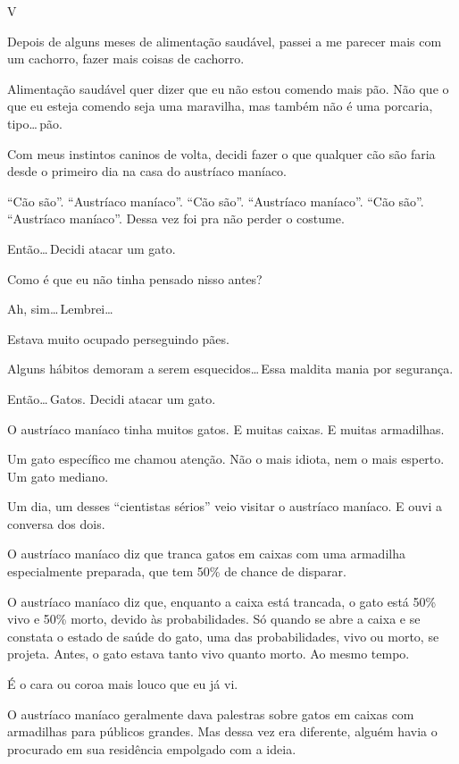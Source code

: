 \begin{center}
{\Large V}
\end{center}

Depois de alguns meses de alimentação saudável, passei a me parecer mais com um cachorro, fazer mais coisas de cachorro.

Alimentação saudável quer dizer que eu não estou comendo mais pão. Não que o que eu esteja comendo seja uma maravilha, mas também não é uma porcaria, tipo\ldots\,pão.

Com meus instintos caninos de volta, decidi fazer o que qualquer cão são faria desde o primeiro dia na casa do austríaco maníaco.

``Cão são''. ``Austríaco maníaco''. ``Cão são''. ``Austríaco maníaco''. ``Cão são''. ``Austríaco maníaco''. Dessa vez foi pra não perder o costume.

Então\ldots\,Decidi atacar um gato.

Como é que eu não tinha pensado nisso antes?

Ah, sim\ldots\,Lembrei\ldots

Estava muito ocupado perseguindo pães.

Alguns hábitos demoram a serem esquecidos\ldots\,Essa maldita mania por segurança.

Então\ldots\,Gatos. Decidi atacar um gato.

O austríaco maníaco tinha muitos gatos. E muitas caixas. E muitas armadilhas.

Um gato específico me chamou atenção. Não o mais idiota, nem o mais esperto. Um gato mediano.

Um dia, um desses ``cientistas sérios'' veio visitar o austríaco maníaco. E ouvi a conversa dos dois.

O austríaco maníaco diz que tranca gatos em caixas com uma armadilha especialmente preparada, que tem 50\% de chance de disparar.

O austríaco maníaco diz que, enquanto a caixa está trancada, o gato está 50\% vivo e 50\% morto, devido às probabilidades. Só quando se abre a caixa e se constata o estado de saúde do gato, uma das probabilidades, vivo ou morto, se projeta. Antes, o gato estava tanto vivo quanto morto. Ao mesmo tempo.

É o cara ou coroa mais louco que eu já vi.

O austríaco maníaco geralmente dava palestras sobre gatos em caixas com armadilhas para públicos grandes. Mas dessa vez era diferente, alguém havia o procurado em sua residência empolgado com a ideia.


